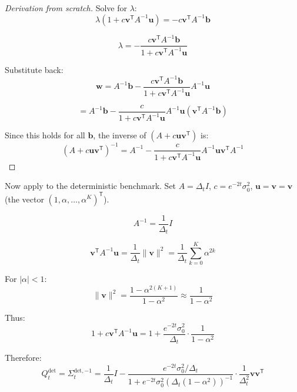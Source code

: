 \documentclass[11pt,a4paper]{article}
\theoremstyle{plain}
\theoremstyle{definition}
\newcommand{\Sig}{\Sigma}
\newcommand{\Prec}{Q}
\newcommand{\delt}{\Delta_t}
\newcommand{\vct}[1]{\mathbf{#1}}
\newcommand{\tr}{\mathsf{T}}
\begin{document}
\begin{proof}[Derivation from scratch]
Solve for $\lambda$:
\begin{equation}
\lambda(1 + c\vct{v}^\tr A^{-1}\vct{u}) = -c\vct{v}^\tr A^{-1}\vct{b}
\end{equation}

\begin{equation}
\lambda = -\frac{c\vct{v}^\tr A^{-1}\vct{b}}{1 + c\vct{v}^\tr A^{-1}\vct{u}}
\end{equation}

Substitute back:
\begin{equation}
\vct{w} = A^{-1}\vct{b} - \frac{c\vct{v}^\tr A^{-1}\vct{b}}{1 + c\vct{v}^\tr A^{-1}\vct{u}} A^{-1}\vct{u}
\end{equation}

\begin{equation}
= A^{-1}\vct{b} - \frac{c}{1 + c\vct{v}^\tr A^{-1}\vct{u}} A^{-1}\vct{u}(\vct{v}^\tr A^{-1}\vct{b})
\end{equation}

Since this holds for all $\vct{b}$, the inverse of $(A + c\vct{u}\vct{v}^\tr)$ is:
\begin{equation}
(A + c\vct{u}\vct{v}^\tr)^{-1} = A^{-1} - \frac{c}{1 + c\vct{v}^\tr A^{-1}\vct{u}} A^{-1}\vct{u}\vct{v}^\tr A^{-1}
\end{equation}

\end{proof}

Now apply to the deterministic benchmark. Set $A = \delt I$, $c = e^{-2t}\sigma_0^2$, $\vct{u} = \vct{v} = \vct{v}$ (the vector $(1, \alpha, \ldots, \alpha^K)^\tr$).

\begin{equation}
A^{-1} = \frac{1}{\delt}I
\end{equation}

\begin{equation}
\vct{v}^\tr A^{-1} \vct{u} = \frac{1}{\delt}\|\vct{v}\|^2 = \frac{1}{\delt}\sum_{k=0}^K \alpha^{2k}
\end{equation}

For $|\alpha| < 1$:
\begin{equation}
\|\vct{v}\|^2 = \frac{1 - \alpha^{2(K+1)}}{1 - \alpha^2} \approx \frac{1}{1-\alpha^2}
\end{equation}

Thus:
\begin{equation}
1 + c\vct{v}^\tr A^{-1}\vct{u} = 1 + \frac{e^{-2t}\sigma_0^2}{\delt}\cdot\frac{1}{1-\alpha^2}
\end{equation}

Therefore:
\begin{equation}
\Prec_t^{\text{det}} = \Sig_t^{\text{det},-1} = \frac{1}{\delt}I - \frac{e^{-2t}\sigma_0^2/\delt}{1 + e^{-2t}\sigma_0^2(\delt(1-\alpha^2))^{-1}} \cdot \frac{1}{\delt^2}\vct{v}\vct{v}^\tr
\end{equation}
\end{document}
